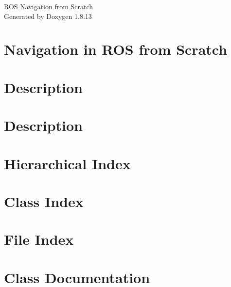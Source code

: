 \documentclass[twoside]{book}
\newcommand{\+}{\discretionary{\mbox{\scriptsize$\hookleftarrow$}}{}{}}
\newcommand{\clearemptydoublepage}{%
  \newpage{\pagestyle{empty}\cleardoublepage}%
}
\begin{document}
\hypersetup{pageanchor=false,
             bookmarksnumbered=true,
             pdfencoding=unicode
            }
\begin{titlepage}
\vspace*{7cm}
\begin{center}%
{\Large R\+OS Navigation from Scratch }\\
\vspace*{1cm}
{\large Generated by Doxygen 1.8.13}\\
\end{center}
\end{titlepage}
\clearemptydoublepage
{}
\tableofcontents
\clearemptydoublepage
{}
\hypersetup{pageanchor=true}

\chapter{Navigation in R\+OS from Scratch}
\label{index}\hypertarget{index}{}
\chapter{Description}
\label{md_nuturtle_description_README}

\chapter{Description}
\label{md_tsim_README}

\chapter{Hierarchical Index}

\chapter{Class Index}

\chapter{File Index}

\chapter{Class Documentation}










\end{document}
